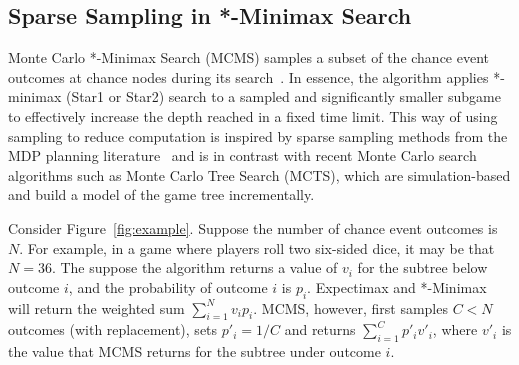 \documentclass{article}
\begin{document}
\subsection{Sparse Sampling in *-Minimax Search}

Monte Carlo *-Minimax Search (MCMS) samples a subset of the chance event outcomes at chance nodes
during its search~\cite{Lanctot13MCMS}. In essence, the algorithm applies *-minimax (Star1 or Star2) search to a sampled 
and significantly smaller subgame to effectively increase the depth reached in a fixed time limit. 
This way of using sampling to reduce computation is inspired by sparse sampling methods from the 
MDP planning literature~\cite{kearns99} and is in contrast with recent Monte Carlo search algorithms such as Monte 
Carlo Tree Search (MCTS), which are simulation-based and build a model of the game tree incrementally.

Consider Figure~\ref{fig:example}. Suppose the number of chance event outcomes is $N$. 
For example, in a game where players roll two six-sided dice, it may be that $N = 36$.  
The suppose the algorithm returns a value of $v_i$ for the subtree below outcome $i$, and the probability of outcome
$i$ is $p_i$. Expectimax and *-Minimax will return the weighted sum $\sum_{i = 1}^N v_i p_i$. MCMS, however, 
first samples $C < N$ outcomes (with replacement), sets $p'_i = 1/C$ and returns $\sum_{i = 1}^C p'_i v'_i$, 
where $v'_i$ is the value that MCMS returns for the subtree under outcome $i$. 
\end{document}
